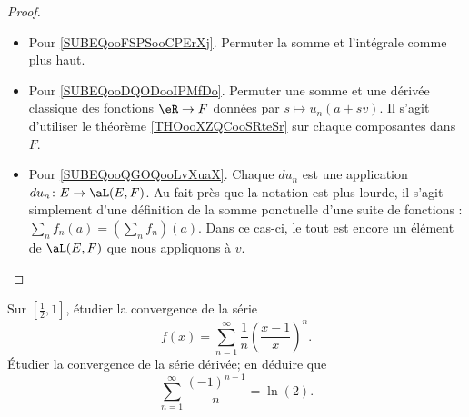 \begin{proof}
\begin{subproof}
\begin{itemize}
			\item Pour \ref{SUBEQooFSPSooCPErXj}. Permuter la somme et l'intégrale comme plus haut.
			\item Pour \ref{SUBEQooDQODooIPMfDo}. Permuter une somme et une dérivée classique des fonctions \( \eR\to F\) données par \( s\mapsto u_n(a+sv)\). Il s'agit d'utiliser le théorème \ref{THOooXZQCooSRteSr} sur chaque composantes dans \( F\).
			\item Pour \ref{SUBEQooQGOQooLvXuaX}. Chaque \( du_n\) est une application \( du_n\colon E\to \aL(E,F)\). Au fait près que la notation est plus lourde, il s'agit simplement d'une définition de la somme ponctuelle d'une suite de fonctions : \( \sum_nf_n(a)=(\sum_nf_n)(a)\). Dans ce cas-ci, le tout est encore un élément de \( \aL(E,F)\) que nous appliquons à \( v\).
		\end{itemize}
	\end{subproof}
\end{proof}


\begin{lemma}       \label{LEMooRIQTooLomsqD}
	Sur \( [\frac{ 1 }{2},1]\), étudier la convergence de la série
	\begin{equation}
		f(x)=\sum_{n=1}^{\infty}\frac{1}{ n }\left( \frac{ x-1 }{ x } \right)^n.
	\end{equation}
	Étudier la convergence de la série dérivée; en déduire que
	\begin{equation}
		\sum_{n=1}^{\infty}\frac{ (-1)^{n-1} }{ n }=\ln(2).
	\end{equation}
\end{lemma}


